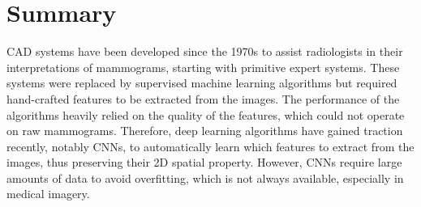 
\section{Summary}
\label{sec:litsurvey-summary}

CAD systems have been developed since the 1970s to assist radiologists in their interpretations of mammograms, starting with primitive expert systems. These systems were replaced by supervised machine learning algorithms but required hand-crafted features to be extracted from the images. The performance of the algorithms heavily relied on the quality of the features, which could not operate on raw mammograms. Therefore, deep learning algorithms have gained traction recently, notably CNNs, to automatically learn which features to extract from the images, thus preserving their 2D spatial property. However, CNNs require large amounts of data to avoid overfitting, which is not always available, especially in medical imagery.
